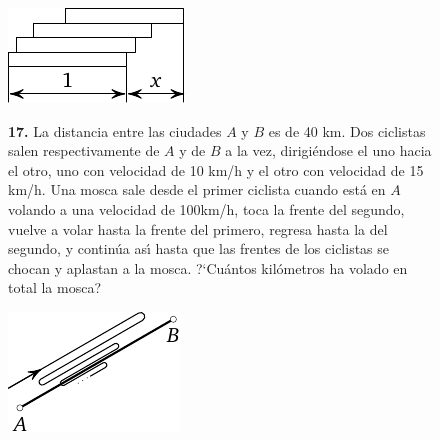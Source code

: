 \documentclass[12pt, spanish]{article}  %
\begin{document}
\begin{figure}[h!]
\centering
\footnotesize
\includegraphics[scale=1]{taskbook-97}
\end{figure}
\begin{figure}[h]
\begin{minipage}[c][][c]{0.7 \textwidth}

\newpage
{\bf 17.} La distancia entre las ciudades $A$ y $B$ es de 40 km. Dos ciclistas salen respectivamente de $A$ y de $B$ 
a la vez, dirigi\'endose el uno hacia el otro, uno con velocidad de 10 km/h y el otro con velocidad de 15 km/h. 
Una mosca sale desde el primer ciclista cuando est\'a en $A$ volando a una velocidad de 100km/h, toca la frente del 
segundo, vuelve a volar hasta la frente del primero, regresa hasta la del segundo, y contin\'ua as\'{\i} hasta que las 
frentes de los ciclistas se chocan y aplastan a la mosca.
?`Cu\'antos kil\'ometros ha volado en total la mosca?
\end{minipage}
\hfill
\begin{minipage}[c]{0.2 \textwidth}
\includegraphics[scale=1]{taskbook-1}
\end{minipage}
\end{figure}

\end{document}
